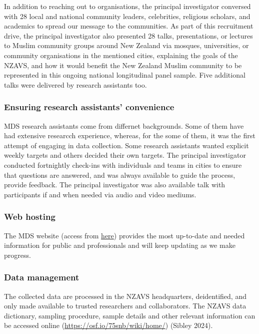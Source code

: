 \documentclass[
]{interact}
\begin{document}
In addition to reaching out to organisations, the principal investigator
conversed with 28 local and national community leaders, celebrities,
religious scholars, and academics to spread our message to the
communities. As part of this recruitment drive, the principal
investigator also presented 28 talks, presentations, or lectures to
Muslim community groups around New Zealand via mosques, universities, or
community organisations in the mentioned cities, explaining the goals of
the NZAVS, and how it would benefit the New Zealand Muslim community to
be represented in this ongoing national longitudinal panel sample. Five
additional talks were delivered by research assistants too.

\subsubsection{Ensuring research assistants'
convenience}\label{ensuring-research-assistants-convenience}

MDS research assistants come from differnet backgrounds. Some of them
have had extensive researcch experience, whereas, for the some of them,
it was the first attempt of engaging in data collection. Some research
assistants wanted explicit weekly targets and others decided their own
targets. The principal investigator conducted fortnightly check-ins with
individuals and teams in cities to ensure that questions are answered,
and was always available to guide the process, provide feedback. The
principal investigator was also available talk with participants if and
when needed via audio and video mediums.

\subsubsection{Web hosting}\label{web-hosting}

The MDS website (access from
\href{https://linktr.ee/muslimdiversity}{here}) provides the most
up-to-date and needed information for public and professionals and will
keep updating as we make progress.

\subsubsection{Data management}\label{data-management}

The collected data are processed in the NZAVS headquarters,
deidentified, and only made available to trusted researchers and
collaborators. The NZAVS data dictionary, sampling procedure, sample
details and other relevant information can be accessed online
(\url{https://osf.io/75snb/wiki/home/}) (Sibley 2024).
\end{document}
